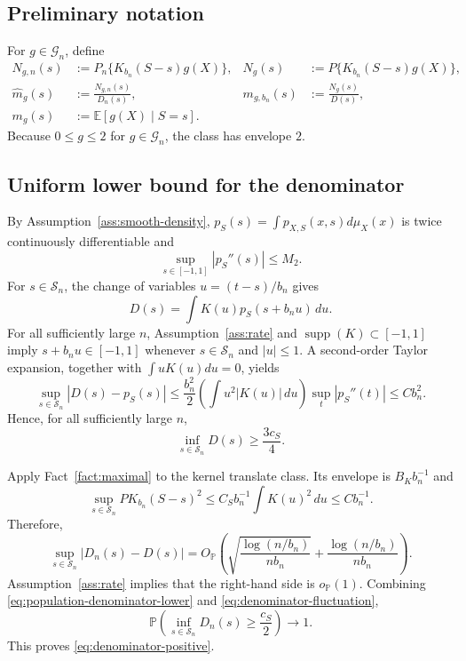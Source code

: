 \documentclass[11pt]{article}
\theoremstyle{remark}
\newcommand{\E}{\mathbb{E}}
\newcommand{\Pp}{\mathbb{P}}
\newcommand{\cS}{\mathcal{S}}
\newcommand{\cG}{\mathcal{G}}
\newcommand{\wh}{\widehat}
\begin{document}
\subsection{Preliminary notation}

For $g\in\cG_n$, define
\begin{align*}
  N_{g,n}(s)&:=P_n\{K_{b_n}(S-s)g(X)\},
  &N_g(s)&:=P\{K_{b_n}(S-s)g(X)\},\\
  \wh m_g(s)&:=\frac{N_{g,n}(s)}{D_n(s)},
  &m_{g,b_n}(s)&:=\frac{N_g(s)}{D(s)},\\
  m_g(s)&:=\E[g(X)\mid S=s].
\end{align*}
Because $0\le g\le2$ for $g\in\cG_n$, the class has envelope $2$.

\subsection{Uniform lower bound for the denominator}

By Assumption~\ref{ass:smooth-density}, $p_S(s)=\int p_{X,S}(x,s)d\mu_X(x)$ is
twice continuously differentiable and
\[
  \sup_{s\in[-1,1]}|p_S''(s)|\le M_2.
\]
For $s\in\cS_n$, the change of variables $u=(t-s)/b_n$ gives
\[
  D(s)
  =
  \int K(u)p_S(s+b_nu)\,du.
\]
For all sufficiently large $n$, Assumption~\ref{ass:rate} and
$\operatorname{supp}(K)\subset[-1,1]$ imply
$s+b_nu\in[-1,1]$ whenever $s\in\cS_n$ and $|u|\le1$.  A second-order Taylor
expansion, together with $\int uK(u)du=0$, yields
\begin{equation}
  \sup_{s\in\cS_n}|D(s)-p_S(s)|
  \le
  \frac{b_n^2}{2}
  \left(\int u^2|K(u)|\,du\right)
  \sup_t|p_S''(t)|
  \le Cb_n^2.
  \label{eq:denominator-bias}
\end{equation}
Hence, for all sufficiently large $n$,
\begin{equation}
  \inf_{s\in\cS_n}D(s)\ge\frac{3c_S}{4}.
  \label{eq:population-denominator-lower}
\end{equation}

Apply Fact~\ref{fact:maximal} to the kernel translate class.  Its envelope is
$B_Kb_n^{-1}$ and
\[
  \sup_{s\in\cS_n}P K_{b_n}(S-s)^2
  \le
  C_Sb_n^{-1}\int K(u)^2\,du
  \le Cb_n^{-1}.
\]
Therefore,
\begin{equation}
  \sup_{s\in\cS_n}|D_n(s)-D(s)|
  =
  O_{\Pp}\!\left(
    \sqrt{\frac{\log(n/b_n)}{nb_n}}
    +
    \frac{\log(n/b_n)}{nb_n}
  \right).
  \label{eq:denominator-fluctuation}
\end{equation}
Assumption~\ref{ass:rate} implies that the right-hand side is $o_{\Pp}(1)$.
Combining \eqref{eq:population-denominator-lower} and
\eqref{eq:denominator-fluctuation},
\begin{equation}
  \Pp\!\left(
    \inf_{s\in\cS_n}D_n(s)\ge\frac{c_S}{2}
  \right)\longrightarrow1.
  \label{eq:empirical-denominator-lower}
\end{equation}
This proves \eqref{eq:denominator-positive}.
\end{document}
